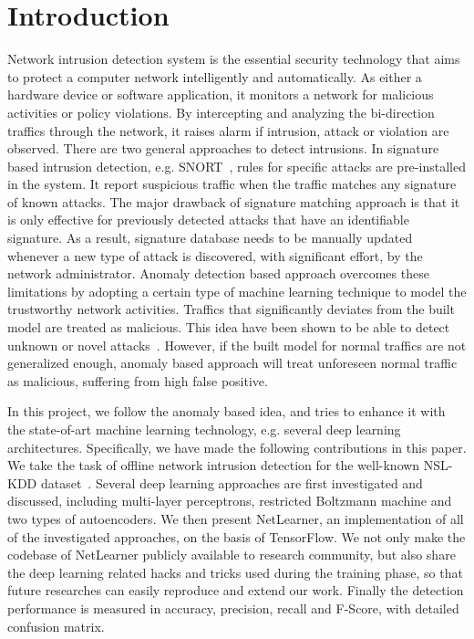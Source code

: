 \section{Introduction}

Network intrusion detection system is the essential security technology that
aims to protect a computer network intelligently and automatically.
As either a hardware device or software application,
it monitors a network for malicious activities or policy violations.
By intercepting and analyzing the bi-direction traffics through the network,
it raises alarm if intrusion, attack or violation are observed.
There are two general approaches to detect intrusions.
In signature based intrusion detection, e.g. SNORT~\cite{Snort},
rules for specific attacks are pre-installed in the system.
It report suspicious traffic when the traffic matches any signature of known attacks.
The major drawback of signature matching approach is that
it is only effective for previously detected attacks that have an identifiable signature.
As a result, signature database needs to be manually updated whenever a new type of attack
is discovered, with significant effort, by the network administrator.
Anomaly detection based approach overcomes these limitations by adopting a certain
type of machine learning technique to model the trustworthy network activities.
Traffics that significantly deviates from the built model are treated as malicious.
This idea have been shown to be able to detect unknown or novel attacks~\cite{NSL-KDD, STL-NIDS}.
However, if the built model for normal traffics are not generalized enough,
anomaly based approach will treat unforeseen normal traffic as malicious,
suffering from high false positive.

In this project, we follow the anomaly based idea, and tries to enhance it with the
state-of-art machine learning technology, e.g. several deep learning architectures.
Specifically, we have made the following contributions in this paper.
We take the task of offline network intrusion detection for the well-known
NSL-KDD dataset~\cite{NSL-KDD}.
Several deep learning approaches are first investigated and discussed,
including multi-layer perceptrons, restricted Boltzmann machine and two types of autoencoders.
We then present NetLearner, an implementation of all of the investigated approaches,
on the basis of TensorFlow.
We not only make the codebase of NetLearner publicly available to research community,
but also share the deep learning related hacks and tricks used during the training phase,
so that future researches can easily reproduce and extend our work.
Finally the detection performance is measured in accuracy, precision, recall and F-Score,
with detailed confusion matrix.

